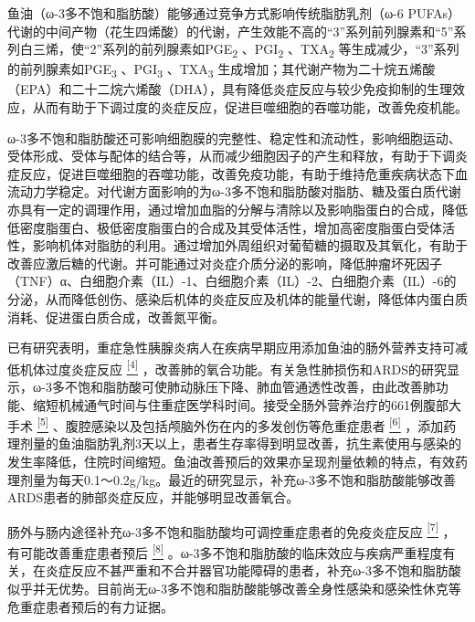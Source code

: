 鱼油（ω-3多不饱和脂肪酸）能够通过竞争方式影响传统脂肪乳剂（ω-6
PUFAs）代谢的中间产物（花生四烯酸）的代谢，产生效能不高的“3”系列前列腺素和“5”系列白三烯，使“2”系列的前列腺素如PGE\textsubscript{2}
、PGI\textsubscript{2} 、TXA\textsubscript{2}
等生成减少，“3”系列的前列腺素如PGE\textsubscript{3}
、PGI\textsubscript{3} 、TXA\textsubscript{3}
生成增加；其代谢产物为二十烷五烯酸（EPA）和二十二烷六烯酸（DHA），具有降低炎症反应与较少免疫抑制的生理效应，从而有助于下调过度的炎症反应，促进巨噬细胞的吞噬功能，改善免疫机能。

ω-3多不饱和脂肪酸还可影响细胞膜的完整性、稳定性和流动性，影响细胞运动、受体形成、受体与配体的结合等，从而减少细胞因子的产生和释放，有助于下调炎症反应，促进巨噬细胞的吞噬功能，改善免疫功能，有助于维持危重疾病状态下血流动力学稳定。对代谢方面影响的为ω-3多不饱和脂肪酸对脂肪、糖及蛋白质代谢亦具有一定的调理作用，通过增加血脂的分解与清除以及影响脂蛋白的合成，降低低密度脂蛋白、极低密度脂蛋白的合成及其受体活性，增加高密度脂蛋白受体活性，影响机体对脂肪的利用。通过增加外周组织对葡萄糖的摄取及其氧化，有助于改善应激后糖的代谢。并可能通过对炎症介质分泌的影响，降低肿瘤坏死因子（TNF）α、白细胞介素（IL）-1、白细胞介素（IL）-2、白细胞介素（IL）-6的分泌，从而降低创伤、感染后机体的炎症反应及机体的能量代谢，降低体内蛋白质消耗、促进蛋白质合成，改善氮平衡。

已有研究表明，重症急性胰腺炎病人在疾病早期应用添加鱼油的肠外营养支持可减低机体过度炎症反应
\protect\hyperlink{text00028.htmlux5cux23ch4-27}{\textsuperscript{{[}4{]}}}
，改善肺的氧合功能。有关急性肺损伤和ARDS的研究显示，ω-3多不饱和脂肪酸可使肺动脉压下降、肺血管通透性改善，由此改善肺功能、缩短机械通气时间与住重症医学科时间。接受全肠外营养治疗的661例腹部大手术
\protect\hyperlink{text00028.htmlux5cux23ch5-27}{\textsuperscript{{[}5{]}}}
、腹腔感染以及包括颅脑外伤在内的多发创伤等危重症患者
\protect\hyperlink{text00028.htmlux5cux23ch6-27}{\textsuperscript{{[}6{]}}}
，添加药理剂量的鱼油脂肪乳剂3天以上，患者生存率得到明显改善，抗生素使用与感染的发生率降低，住院时间缩短。鱼油改善预后的效果亦呈现剂量依赖的特点，有效药理剂量为每天0.1～0.2g/kg。最近的研究显示，补充ω-3多不饱和脂肪酸能够改善ARDS患者的肺部炎症反应，并能够明显改善氧合。

肠外与肠内途径补充ω-3多不饱和脂肪酸均可调控重症患者的免疫炎症反应
\protect\hyperlink{text00028.htmlux5cux23ch7-27}{\textsuperscript{{[}7{]}}}
，有可能改善重症患者预后
\protect\hyperlink{text00028.htmlux5cux23ch8-27}{\textsuperscript{{[}8{]}}}
。ω-3多不饱和脂肪酸的临床效应与疾病严重程度有关，在炎症反应不甚严重和不合并器官功能障碍的患者，补充ω-3多不饱和脂肪酸似乎并无优势。目前尚无ω-3多不饱和脂肪酸能够改善全身性感染和感染性休克等危重症患者预后的有力证据。

